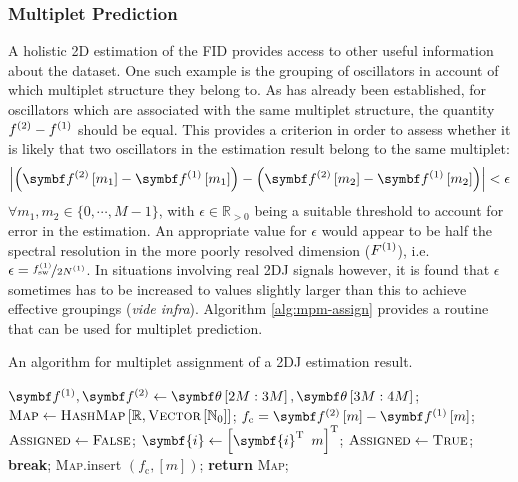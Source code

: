 \subsubsection{Multiplet Prediction}
A holistic \ac{2D} estimation of the \ac{FID} provides access to other useful
information about the dataset. One such example is the grouping of oscillators
in account of which multiplet structure they belong to. As has already been
established, for oscillators which are associated with the same multiplet
structure, the quantity $f^{(2)} - f^{(1)}$ should be equal. This provides a
criterion in order to assess whether it is likely that two oscillators in the
estimation result belong to the same multiplet:
\begin{equation}
    \left \lvert
        \left( \bdftwo \left[ m_1 \right] -
        \bdfone \left[ m_1 \right] \right) -
        \left( \bdftwo \left[ m_2 \right] -
        \bdfone \left[ m_2 \right] \right)
    \right \rvert < \epsilon
\end{equation}
$\forall m_1, m_2 \in \lbrace 0, \cdots, M-1 \rbrace$, with  $\epsilon \in
\mathbb{R}_{>0}$ being a suitable threshold to account for error in the
estimation. An appropriate value for $\epsilon$ would appear to be half the
spectral resolution in the more poorly resolved dimension ($F^{(1)}$), i.e.
$\epsilon = \nicefrac{f_{\mathrm{sw}}^{(1)}}{2 N^{(1)}}$. In situations involving real \ac{2DJ}
signals however, it is found that $\epsilon$ sometimes has to be increased to
values slightly larger than this to achieve effective groupings (\textit{vide
infra}). Algorithm \ref{alg:mpm-assign} provides a routine that can be used for
multiplet prediction.


\begin{algorithm}
    \caption{An algorithm for multiplet assignment of a \ac{2DJ} estimation result.}\label{alg:mp-assign}
    \begin{algorithmic}[1]
        \State $\bdfone, \bdftwo \gets \bth\left[2M : 3M\right], \bth\left[3M : 4M\right]$;
        \State $\textsc{Map} \gets \textsc{HashMap}\left[\mathbb{R}, \textsc{Vector}\left[\mathbb{N}_0\right]\right]$;
            \State $f_{\text{c}} = \bdftwom - \bdfonem$;
            \State $\textsc{Assigned} \gets \textsc{False}$;
                    \State $\symbf{i} \gets \left[ \symbf{i}\T \hspace{5pt} m \right]\T$;
                    \State $\textsc{Assigned} \gets \textsc{True}$;
                    \State \textbf{break};
                \EndIf
            \EndFor
                \State \textsc{Map}.insert $\left(f_{\text{c}}, \left[m\right]\right)$;
            \EndIf
        \EndFor
        \State \textbf{return} \textsc{Map};
        \EndProcedure
    \end{algorithmic}
\end{algorithm}

